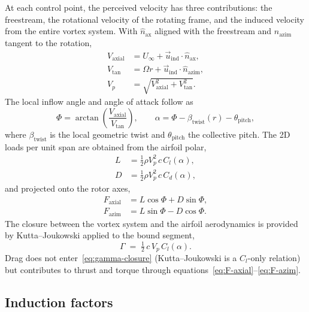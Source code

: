 At each control point, the perceived velocity has three contributions: the freestream, the rotational velocity of the rotating frame, and the induced velocity from the entire vortex system. With $\hat{n}_{\text{ax}}$ aligned with the freestream and $\hat{n}_{\text{azim}}$ tangent to the rotation,
\begin{align}
V_{\text{axial}} &= U_\infty + \vec{u}_{\text{ind}}\!\cdot\!\hat{n}_{\text{ax}}, \label{eq:V-axial}\\
V_{\text{tan}} &= \Omega r + \vec{u}_{\text{ind}}\!\cdot\!\hat{n}_{\text{azim}}, \label{eq:V-tan}\\
V_p &= \sqrt{V_{\text{axial}}^2 + V_{\text{tan}}^2}. \label{eq:V-p}
\end{align}
The local inflow angle and angle of attack follow as
\begin{equation}
\Phi = \arctan\!\left(\frac{V_{\text{axial}}}{V_{\text{tan}}}\right),
\qquad
\alpha = \Phi - \beta_{\text{twist}}(r) - \theta_{\text{pitch}},
\label{eq:phi-alpha}
\end{equation}
where $\beta_{\text{twist}}$ is the local geometric twist and $\theta_{\text{pitch}}$ the collective pitch. The 2D loads per unit span are obtained from the airfoil polar,
\begin{align}
L &= \tfrac{1}{2}\rho V_p^2\,c\,C_l(\alpha), \label{eq:lift}\\
D &= \tfrac{1}{2}\rho V_p^2\,c\,C_d(\alpha), \label{eq:drag}
\end{align}
and projected onto the rotor axes,
\begin{align}
F_{\text{axial}} &= L\cos\Phi + D\sin\Phi, \label{eq:F-axial}\\
F_{\text{azim}}  &= L\sin\Phi - D\cos\Phi. \label{eq:F-azim}
\end{align}
The closure between the vortex system and the airfoil aerodynamics is provided by Kutta--Joukowski applied to the bound segment,
\begin{equation}
\Gamma \;=\; \tfrac{1}{2}\,c\,V_p\,C_l(\alpha).
\label{eq:gamma-closure}
\end{equation}
Drag does not enter~\eqref{eq:gamma-closure} (Kutta--Joukowski is a $C_l$-only relation) but contributes to thrust and torque through equations~\eqref{eq:F-axial}--\eqref{eq:F-azim}.

\subsection{Induction factors}
\label{sec:induction-factors}

